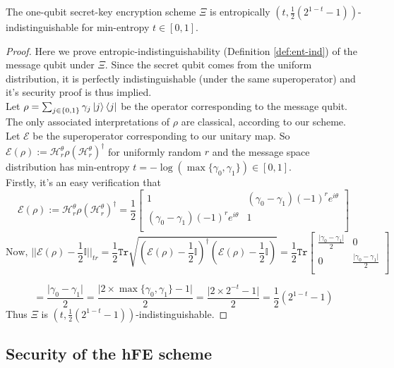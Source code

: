 \begin{theorem}
\label{thm:xi-entindist}
The one-qubit secret-key encryption scheme $\Xi$ is entropically $(t,\frac{1}{2}(2^{1-t}-1))$-indistinguishable for min-entropy $t \in [0,1]$.
\end{theorem}
\begin{proof}
Here we prove entropic-indistinguishability (Definition \ref{def:ent-ind}) of the message qubit under $\Xi$. Since the secret qubit comes from the uniform distribution, it is perfectly indistinguishable (under the same superoperator) and it's security proof is thus implied. \\
Let $\rho = \sum_{j \in \{0,1\}} \gamma_j \ket{j}\bra{j}$ be the operator corresponding to the message qubit. The only associated interpretations of $\rho$ are classical, according to our scheme. Let $\mathcal{E}$ be the superoperator corresponding to our unitary map. So 
$\mathcal{E}(\rho) := \mathcal{H}^\theta_r \rho (\mathcal{H}^\theta_r)^\dagger$ for uniformly random $r$ and the message space distribution has min-entropy $t = - \log(\max\{\gamma_0,\gamma_1\}) \in [0,1]$. \\
Firstly, it's an easy verification that 
\[ \mathcal{E}(\rho) := \mathcal{H}^\theta_r \rho (\mathcal{H}^\theta_r)^\dagger = \frac{1}{2}
\begin{bmatrix}
    1 & (\gamma_0 - \gamma_1)(-1)^re^{i\theta} \\
    (\gamma_0 - \gamma_1)(-1)^re^{i\theta} & 1 \\
\end{bmatrix} \]
\[ \text{Now, } \lvert\lvert \mathcal{E}(\rho) - \frac{1}{2}\mathbb{I}\rvert\rvert_{tr} = 
\frac{1}{2} \texttt{Tr} \sqrt{(\mathcal{E}(\rho) - \frac{1}{2}\mathbb{I})^\dagger(\mathcal{E}(\rho) - \frac{1}{2}\mathbb{I})} 
= \frac{1}{2} \texttt{Tr}
\begin{bmatrix}
    \frac{\lvert \gamma_0 - \gamma_1\rvert}{2} & 0 \\
    0 & \frac{\lvert \gamma_0 - \gamma_1\rvert}{2}  \\
\end{bmatrix}
 \]
 
 \[ = \frac{\lvert \gamma_0 - \gamma_1\rvert}{2} =  \frac{\lvert 2 \times \max\{\gamma_0,\gamma_1\} - 1 \rvert}{2}  = \frac{\lvert 2 \times 2^{-t} - 1 \rvert}{2} =  \frac{1}{2}(2^{1-t}-1) \]
Thus $\Xi$ is $(t,\frac{1}{2}(2^{1-t}-1))$-indistinguishable.
\end{proof}


\subsection{Security of the hFE scheme}
\label{sec:hFE-sec}

